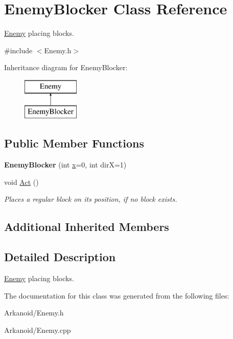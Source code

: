 \hypertarget{class_enemy_blocker}{}\section{Enemy\+Blocker Class Reference}
\label{class_enemy_blocker}


\hyperlink{class_enemy}{Enemy} placing blocks.  




{\ttfamily \#include $<$Enemy.\+h$>$}

Inheritance diagram for Enemy\+Blocker\+:\begin{figure}[H]
\begin{center}
\leavevmode
\includegraphics[height=2.000000cm]{class_enemy_blocker}
\end{center}
\end{figure}
\subsection*{Public Member Functions}
\begin{DoxyCompactItemize}
\item 
\mbox{\label{class_enemy_blocker_a7e2eea95d73fb0ab5aa12f77ff1fbbb4}} 
{\bfseries Enemy\+Blocker} (int \hyperlink{class_enemy_a05e9e91e87d6eae0da31cc6d78a0b43d}{x}=0, int dirX=1)
\item 
\mbox{\label{class_enemy_blocker_a9d56baea3bee22d819db3cc5be8c9e20}} 
void \hyperlink{class_enemy_blocker_a9d56baea3bee22d819db3cc5be8c9e20}{Act} ()
\begin{DoxyCompactList}\small\item\em Places a regular block on its position, if no block exists. \end{DoxyCompactList}\end{DoxyCompactItemize}
\subsection*{Additional Inherited Members}


\subsection{Detailed Description}
\hyperlink{class_enemy}{Enemy} placing blocks. 

The documentation for this class was generated from the following files\+:\begin{DoxyCompactItemize}
\item 
Arkanoid/Enemy.\+h\item 
Arkanoid/Enemy.\+cpp\end{DoxyCompactItemize}
